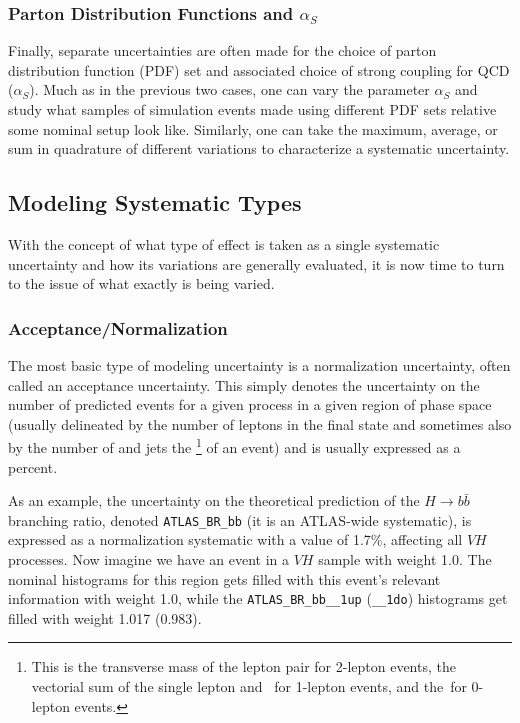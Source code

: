 \subsubsection{Parton Distribution Functions and $\alpha_S$}
\label{sec:pdfas}
Finally, separate uncertainties are often made for the choice of parton distribution function (PDF) set and associated choice of strong coupling for QCD ($\alpha_S$).  Much as in the previous two cases, one can vary the parameter $\alpha_S$ and study what samples of simulation events made using different PDF sets relative some nominal setup look like.  Similarly, one can take the maximum, average, or sum in quadrature of different variations to characterize a systematic uncertainty.

\subsection{Modeling Systematic Types}
With the concept of what type of effect is taken as a single systematic uncertainty and how its variations are generally evaluated, it is now time to turn to the issue of what exactly is being varied.
\subsubsection{Acceptance/Normalization}
The most basic type of modeling uncertainty is a normalization uncertainty, often called an acceptance uncertainty.  This simply denotes the uncertainty on the number of predicted events for a given process in a given region of phase space (usually delineated by the number of leptons in the final state and sometimes also by the number of and jets the \ptv\footnote{This is the transverse mass of the lepton pair for 2-lepton events, the vectorial sum of the single lepton and \met\, for 1-lepton events, and the \met\,for 0-lepton events.} of an event) and is usually expressed as a percent.  

As an example, the uncertainty on the theoretical prediction of the $H\to b\bar{b}$ branching ratio, denoted \texttt{ATLAS\_BR\_bb} (it is an ATLAS-wide systematic), is expressed as a normalization systematic with a value of 1.7\%, affecting all $VH$ processes.  Now imagine we have an event in a $VH$ sample with weight 1.0.  The nominal histograms for this region gets filled with this event's relevant information with weight 1.0, while the \texttt{ATLAS\_BR\_bb\_\_1up} (\texttt{\_\_1do}) histograms get filled with weight 1.017 (0.983).

